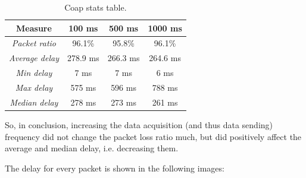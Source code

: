\documentclass[]{article}
\begin{document}
\begin{table}
\centering
\begin{tabular}{|c|c|c|c|}
	\hline
	\textbf{Measure} & \textbf{100 ms} & \textbf{500 ms} & \textbf{1000 ms} \\
	\hline
	\textit{Packet ratio} & 96.1\% & 95.8\%  & 96.1\% \\
	\hline
	\textit{Average delay} & 278.9 ms & 266.3 ms & 264.6 ms \\
	\hline
	\textit{Min delay} & 7 ms & 7 ms & 6 ms \\
	\hline
	\textit{Max delay} & 575 ms & 596 ms & 788 ms \\
	\hline
	\textit{Median delay} & 278 ms & 273 ms & 261 ms \\
	\hline
\end{tabular} 
\caption{\label{coap}Coap stats table.}
\end{table}

So, in conclusion, increasing the data acquisition (and  thus data sending) frequency did not change the packet loss ratio much, but did positively affect the average and median delay, i.e. decreasing them. 

The delay for every packet is shown in the following images:
\end{document}
